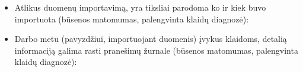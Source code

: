 \begin{itemize}
  \item Atlikus duomenų importavimą, yra tiksliai parodoma ko ir kiek buvo importuota
  (būsenos matomumas, palengvinta klaidų diagnozė):

  \item Darbo metu (pavyzdžiui, importuojant duomenis) įvykus klaidoms, detalią informaciją
    galima rasti pranešimų žurnale (būsenos matomumas, palengvinta klaidų diagnozė):
\end{itemize}
